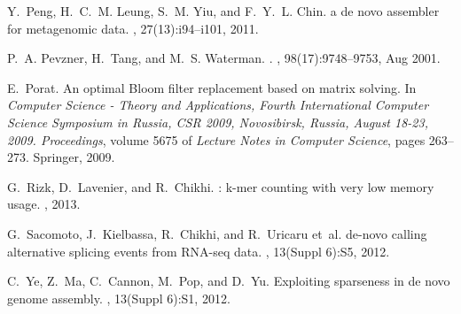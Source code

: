 \documentclass[pdftex]{llncs}\usepackage[T1]{fontenc}
\begin{document}
\begin{thebibliography}{10}
Y.~Peng, H.~C.~M. Leung, S.~M. Yiu, and F.~Y.~L. Chin.
 a de novo assembler for metagenomic data.
, 27(13):i94--i101, 2011.

P.~A. Pevzner, H.~Tang, and M.~S. Waterman.
.
, 98(17):9748--9753, Aug 2001.

E.~Porat.
\newblock An optimal {B}loom filter replacement based on matrix solving.
\newblock In {\em Computer Science - Theory and Applications, Fourth
  International Computer Science Symposium in Russia, CSR 2009, Novosibirsk,
  Russia, August 18-23, 2009. Proceedings}, volume 5675 of {\em Lecture Notes
  in Computer Science}, pages 263--273. Springer, 2009.

G.~Rizk, D.~Lavenier, and R.~Chikhi.
: k-mer counting with very low memory usage.
, 2013.

G.~Sacomoto, J.~Kielbassa, R.~Chikhi, and R.~Uricaru et~al.
 de-novo calling alternative splicing events from
  {RNA-seq} data.
, 13(Suppl 6):S5, 2012.

C.~Ye, Z.~Ma, C.~Cannon, M.~Pop, and D.~Yu.
\newblock Exploiting sparseness in de novo genome assembly.
, 13(Suppl 6):S1, 2012.

\end{thebibliography}
\end{document}

